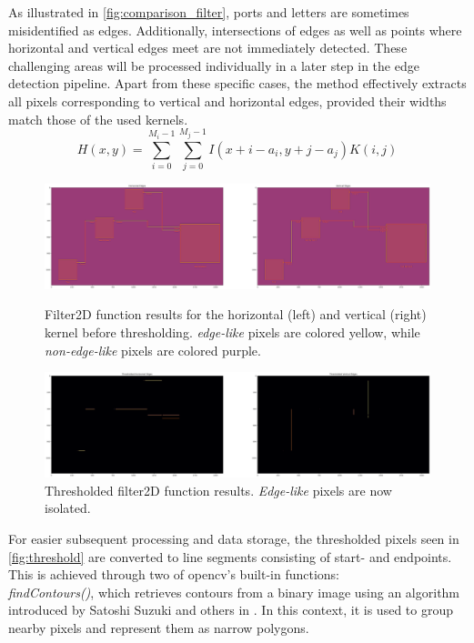 As illustrated in \autoref{fig:comparison_filter}, ports and letters are sometimes misidentified as edges. Additionally, intersections of edges as well as points where horizontal and vertical edges meet are not immediately detected. These challenging areas will be processed individually in a later step in the edge detection pipeline. Apart from these specific cases, the method effectively extracts all pixels corresponding to vertical and horizontal edges, provided their widths match those of the used kernels.
\begin{equation}
\label{eq:filter2D}
    H(x, y) = \sum_{i=0}^{M_i-1} \sum_{j=0}^{M_j-1} I(x + i - a_i,y + j - a_j)K(i, j)
\end{equation}

\newpage

\begin{figure}[htb]
    \centering
    \includegraphics[width=1\linewidth]{pictures/filter2D.png}
    \caption{Filter2D function results for the horizontal (left) and vertical (right) kernel before thresholding. \textit{edge-like} pixels are colored yellow, while \textit{non-edge-like} pixels are colored purple.}
    \label{fig:filter2d}

    \centering
    \includegraphics[width=1\linewidth]{pictures/threshold.png}
    \caption{Thresholded filter2D function results. \textit{Edge-like} pixels are now isolated.}
    \label{fig:threshold}
\end{figure}
For easier subsequent processing and data storage, the thresholded pixels seen in \autoref{fig:threshold} are converted to line segments consisting of start- and endpoints. This is achieved through two of \acrshort{opencv}'s built-in functions:\\
\textit{findContours()}, which retrieves contours from a binary image using an algorithm introduced by Satoshi Suzuki and others in \cite{suzuki_1985}. In this context, it is used to group nearby pixels and represent them as narrow polygons.\\
